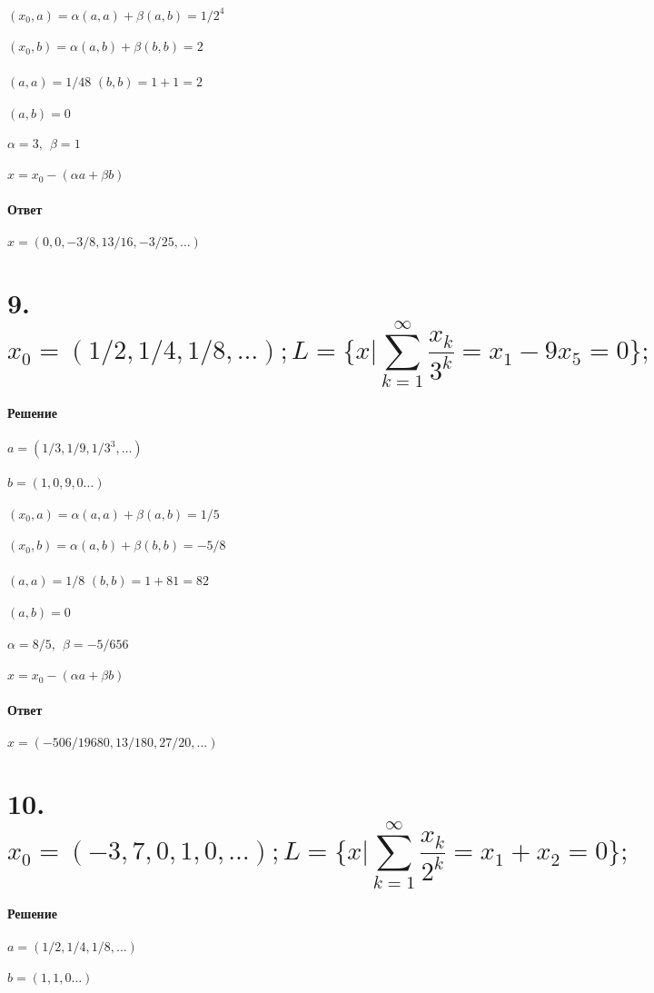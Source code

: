 \documentclass{article}
\begin{document}
	$(x_0, a)=\alpha(a,a)+\beta(a,b)=1/2^4$\\ \\
	$(x_0, b)=\alpha(a,b)+\beta(b,b)=2$\\ \\
	$(a,a)=1/48 $
	$(b,b)=1+1=2$\\ \\
	$(a,b)=0$\\ \\
	$\alpha=3,\ \ \beta=1$\\ \\
	$x = x_0 - (\alpha a+\beta b)$\\ \\
	\textbf{Ответ}\\ \\
	$x=(0,0,-3/8,13/16,-3/25,\dots)$		
	
	
	\section*{9.
	$$x_0=(1/2,1/4,1/8,\dots); L=\{x|\sum_{k=1}^{\infty}\frac{x_k}{3^k}=x_1-9x_5=0 \};$$}
	\textbf{Решение}\\ \\
	$a=(1/3,1/9,1/3^3,\dots)$\\ \\
	$b=(1,0,9,0\dots)$\\ \\
	
	$(x_0, a)=\alpha(a,a)+\beta(a,b)=1/5$\\ \\
	$(x_0, b)=\alpha(a,b)+\beta(b,b)=-5/8$\\ \\
	$(a,a)=1/8 $
	$(b,b)=1+81=82$\\ \\
	$(a,b)=0$\\ \\
	$\alpha=8/5,\ \ \beta=-5/656$\\ \\
	$x = x_0 - (\alpha a+\beta b)$\\ \\
	\textbf{Ответ}\\ \\
	$x=(-506/19680,13/180,27/20,\dots)$	
		
		
		\section*{10.
		$$x_0=(-3,7,0,1,0,\dots); L=\{x|\sum_{k=1}^{\infty}\frac{x_k}{2^k}=x_1+x_2=0 \};$$}
		\textbf{Решение}\\ \\
		$a=(1/2,1/4,1/8,\dots)$\\ \\
		$b=(1,1,0\dots)$\\ \\
		
\end{document}
